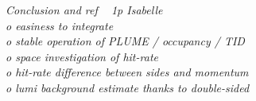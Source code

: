 {\it Conclusion and ref ~ 1p  Isabelle\\    
   o easiness to integrate\\
   o stable operation of PLUME / occupancy / TID\\
   o space investigation of hit-rate\\
   o hit-rate difference between sides and momentum \\
   o lumi background estimate thanks to double-sided
}